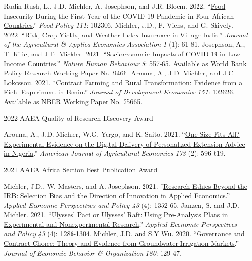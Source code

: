 \documentclass[letterpaper]{article}
\renewenvironment{itemize}{
  \begin{list}
  	{}{
    \setlength{\leftmargin}{1.5em}
    \setlength{\itemsep}{-.5em}
  }
}{
  \end{list}
}
\begin{document}
\begin{itemize}
\subitem[19] Rudin-Rush, L., J.D. Michler, A. Josephson, and J.R. Bloem. 2022. ``\href{https://doi.org/10.1016/j.foodpol.2022.102306}{Food Insecurity During the First Year of the COVID-19 Pandemic in Four African Countries}.'' \emph{Food Policy 111}: 102306.
\subitem[18] Michler, J.D., F. Viens, and G. Shively. 2022. ``\href{https://doi.org/10.1002/jaa2.9}{Risk, Crop Yields, and  Weather Index Insurance in Village India}.'' \emph{Journal of the Agricultural \& Applied Economics Association 1} (1): 61-81. 
\subitem[17] Josephson, A., T. Kilic, and J.D. Michler. 2021. ``\href{https://www.nature.com/articles/s41562-021-01096-7}{Socioeconomic Impacts of COVID-19 in Low-Income Countries}.'' \emph{Nature Human Behaviour 5}: 557-65. Available as \href{https://openknowledge.worldbank.org/handle/10986/34733}{World Bank Policy Research Working Paper No. 9466}.
\subitem[16] Arouna, A., J.D. Michler, and J.C. Lokossou. 2021.  ``\href{https://doi.org/10.1016/j.jdeveco.2021.102626}{Contract Farming and Rural Transformation: Evidence from a Field Experiment in Benin}.'' \emph{Journal of Development Economics 151}: 102626. Available as \href{https://www.nber.org/papers/w25665.pdf}{NBER Working Paper No. 25665}.
\begin{itemize}
        \leftskip 0.25in
	\parindent -0.5in
	\item[\textbullet] 2022 AAEA Quality of Research Discovery Award
\end{itemize}
\subitem[15] Arouna, A., J.D. Michler, W.G. Yergo, and K. Saito. 2021. ``\href{https://doi.org/10.1111/ajae.12151}{One Size Fits All? Experimental Evidence on the Digital Delivery of Personalized Extension Advice in Nigeria}.'' \emph{American Journal of Agricultural Economics 103} (2): 596-619.
\begin{itemize}
        \leftskip 0.25in
        \parindent -0.5in
        \item[\textbullet] 2021 AAEA Africa Section Best Publication Award
\end{itemize}
\subitem[14] Michler, J.D., W. Masters, and A. Josephson. 2021. ``\href{https://doi.org/10.1002/aepp.13132}{Research Ethics Beyond the IRB: Selection Bias and the Direction of Innovation in Applied Economics}.'' \emph{Applied Economic Perspectives and Policy 43} (4): 1352-65.
\subitem[13] Janzen, S. and J.D. Michler. 2021. ``\href{https://doi.org/10.1002/aepp.13133}{Ulysses' Pact or Ulysses' Raft: Using Pre-Analysis Plans in Experimental and Nonexperimental Research}.'' \emph{Applied Economic Perspectives and Policy 43} (4): 1286-1304.
\subitem[12] Michler, J.D. and S.Y Wu. 2020. ``\href{https://doi.org/10.1016/j.jebo.2020.09.031}{Governance and Contract Choice: Theory and Evidence from Groundwater Irrigation Markets}.'' \emph{Journal of Economic Behavior \& Organization 180}: 129-47.

\end{itemize}
\end{document}
